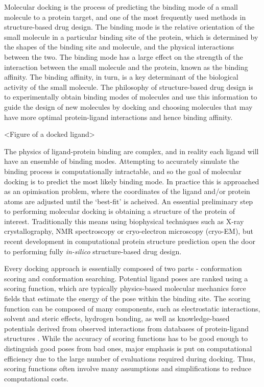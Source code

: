 Molecular docking is the process of predicting the binding mode of a small molecule to a protein target, and one of the most frequently used methods in structure-based drug design. \cite{meng2011molecular, Kitchen2004Docking} The binding mode is the relative orientation of the small molecule in a particular binding site of the protein, which is determined by the shapes of the binding site and molecule, and the physical interactions between the two. The binding mode has a large effect on the strength of the interaction between the small molecule and the protein, known as the binding affinity. The binding affinity, in turn, is a key determinant of the biological activity of the small molecule. The philosophy of structure-based drug design is to experimentally obtain binding modes of molecules and use this information to guide the design of new molecules by docking and choosing molecules that may have more optimal protein-ligand interactions and hence binding affinity.

<Figure of a docked ligand>

The physics of ligand-protein binding are complex, and in reality each ligand will have an ensemble of binding modes. Attempting to accurately simulate the binding process is computationally intractable, and so the goal of molecular docking is to predict the most likely binding mode. In practice this is approached as an opimisation problem, where the coordinates of the ligand and/or protein atoms are adjusted until the `best-fit' is acheived. An essential preliminary step to performing molecular docking is obtaining a structure of the protein of interest. Traditionally this means using biophysical techniques such as X-ray crystallography, NMR spectroscopy or cryo-electron microscopy (cryo-EM), but recent development in computational protein structure prediction \cite{Jumper2021AlphaFold, Wong2022AF2Docking} open the door to performing fully \textit{in-silico} structure-based drug design.

Every docking approach is essentially composed of two parts - conformation scoring and conformation searching. Potential ligand poses are ranked using a scoring function, which are typically physics-based molecular mechanics force fields that estimate the energy of the pose within the binding site. The scoring function can be composed of many components, such as electrostatic interactions, solvent and steric effects, hydrogen bonding, as well as knowledge-based potentials derived from observed interactions from databases of protein-ligand structures \cite{Li2019scoring}. While the accuracy of scoring functions has to be good enough to distinguish good poses from bad ones, major emphasis is put on computational efficiency due to the large number of evaluations required during docking. Thus, scoring functions often involve many assumptions and simplifications to reduce computational costs.

